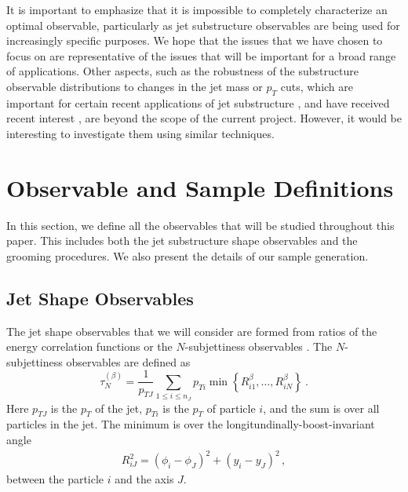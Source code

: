\documentclass[11pt]{cernrep}
\begin{document}
It is important to emphasize that it is impossible to completely
characterize an optimal observable, particularly as jet substructure
observables are being used for increasingly specific
purposes.
%
We hope that the issues that we have chosen to focus on
are representative of the issues that will be important for a broad
range of applications.
%
Other aspects, such as the robustness of the substructure observable distributions to changes in the jet mass or $p_T$ cuts, which are important for certain recent applications of jet substructure \cite{Sirunyan:2017dgc,CMS-PAS-HIG-17-010,CMS-PAS-EXO-17-001,Sirunyan:2017dnz,Sirunyan:2017nvi,Aaboud:2018zba}, and have received recent interest \cite{Shimmin:2017mfk,Aguilar-Saavedra:2017rzt,Moult:2017okx}, are
beyond the scope of the current project.
However, it would be interesting to investigate them
using similar techniques.




\section{Observable and Sample Definitions}\label{jetsub_2prong_sec:obs_def}

In this section, we define all the observables that will be studied throughout this paper.
%
This includes both the jet substructure shape observables and the grooming procedures.  We also present the details of our sample generation.




\subsection{Jet Shape Observables}\label{jetsub_2prong_sec:shape_def}

The jet shape observables that we will consider are formed from ratios of the energy correlation functions \cite{Larkoski:2013eya,Moult:2016cvt} or the $N$-subjettiness observables \cite{Thaler:2010tr,Thaler:2011gf}.
%
The $N$-subjettiness observables are defined as \cite{Stewart:2010tn,Thaler:2010tr,Thaler:2011gf}
%
\begin{equation}\label{jetsub_2prong_eq:nsubdef}
\tau_{N}^{(\beta)} = \frac{1}{p_{TJ}}\sum_{1\leq i \leq n_J} p_{Ti}\min\left\{
R_{i1}^\beta,\dotsc,R_{iN}^\beta
\right\} \ .
\end{equation}
%
Here $p_{TJ}$ is the $p_T$ of the jet, $p_{Ti}$ is the $p_T$ of particle $i$, and the sum is over all particles in the jet.
%
The minimum is over the longitundinally-boost-invariant angle
%
\begin{align}
R_{iJ}^2 = (\phi_i-\phi_J)^2+(y_i-y_J)^2\,,
\end{align}
%
between the particle $i$ and the axis $J$.
\end{document}
